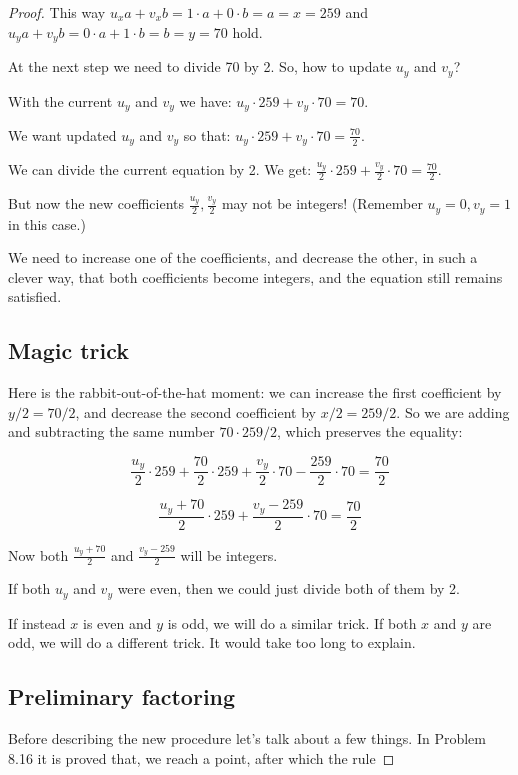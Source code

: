\documentclass[14pt]{extarticle}
\begin{document}
\begin{proof}
This way $u_x a + v_x b = 1\cdot a + 0\cdot b = a = x = 259$ and  $u_y a + v_y b = 0 \cdot a + 1\cdot b = b = y = 70$ hold.

At the next step we need to divide 70 by 2. So, how to update $u_y$ and $v_y$?

With the current $u_y$ and $v_y$ we have: $u_y\cdot 259 + v_y\cdot 70 = 70$.

We want updated $u_y$ and $v_y$ so that: $u_y\cdot 259 + v_y\cdot 70 = \frac{70}{2}$.

We can divide the current equation by 2. We get: $\displaystyle \frac{u_y}{2}\cdot 259 + \frac{v_y}{2}\cdot 70 = \frac{70}{2}$.

But now the new coefficients $\displaystyle \frac{u_y}{2}, \frac{v_y}{2}$ may not be integers! (Remember $u_y = 0, v_y = 1$ in this case.)

We need to increase one of the coefficients, and decrease the other, in such a clever way, that both coefficients become integers, and the equation still remains satisfied.

\subsection{Magic trick}

Here is the rabbit-out-of-the-hat moment: we can increase the first coefficient by $y / 2 = 70 / 2$, and decrease the second coefficient by $x / 2 = 259/2$. So we are adding and subtracting the same number $70 \cdot 259 / 2$, which preserves the equality:

$$
\frac{u_y}{2}\cdot 259 + \frac{70}{2}\cdot 259 + \frac{v_y}{2}\cdot 70 - \frac{259}{2}\cdot 70 = \frac{70}{2}
$$

$$
\frac{u_y + 70}{2}\cdot 259 + \frac{v_y - 259}{2}\cdot 70 = \frac{70}{2}
$$

Now both $\displaystyle\frac{u_y + 70}{2}$ and $\displaystyle\frac{v_y - 259}{2}$ will be integers.

If both $u_y$ and $v_y$ were even, then we could just divide both of them by 2. 

If instead $x$ is even and $y$ is odd, we will do a similar trick. If both $x$ and $y$ are odd, we will do a different trick. It would take too long to explain.

\subsection{Preliminary factoring}

Before describing the new procedure let's talk about a few things. In Problem 8.16 it is proved that, we reach a point, after which the rule 


\end{proof}
\end{document}
